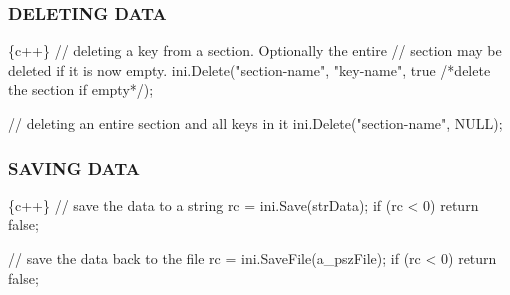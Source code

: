 \subsubsection*{D\+E\+L\+E\+T\+I\+NG D\+A\+TA}


\begin{DoxyCode}
\{c++\}
// deleting a key from a section. Optionally the entire
// section may be deleted if it is now empty.
ini.Delete("section-name", "key-name", 
    true /*delete the section if empty*/);

// deleting an entire section and all keys in it
ini.Delete("section-name", NULL);
\end{DoxyCode}


\subsubsection*{S\+A\+V\+I\+NG D\+A\+TA}


\begin{DoxyCode}
\{c++\}
// save the data to a string
rc = ini.Save(strData);
if (rc < 0) return false;

// save the data back to the file
rc = ini.SaveFile(a\_pszFile);
if (rc < 0) return false;
\end{DoxyCode}
 